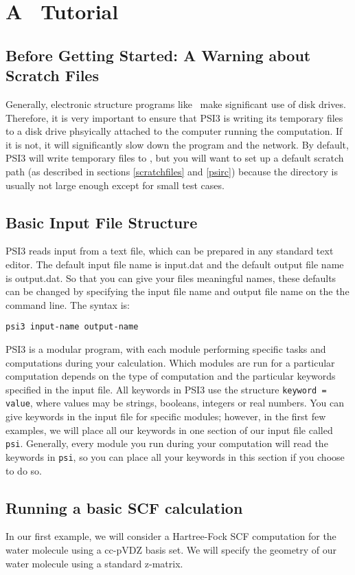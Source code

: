 \section{A \PSIthree\ Tutorial} \label{tutorial}

\subsection{Before Getting Started: A Warning about Scratch Files}
Generally, electronic structure programs like \PSIthree\ make
significant use of disk drives.  Therefore, it is very important
to ensure that PSI3 is writing its temporary files to a disk drive
phsyically attached to the computer running the computation.  If it
is not, it will significantly slow down the program and the network.
By default, PSI3 will write temporary files to , but you
will want to set up a default scratch path (as described in sections
\ref{scratchfiles} and \ref{psirc}) because the  directory
is usually not large enough except for small test cases.

\subsection{Basic Input File Structure} 

PSI3 reads input from a text file, which can be prepared in any standard
text editor.  The default input file name is input.dat and the default
output file name is output.dat.  So that you can give your files meaningful
names, these defaults can be changed by specifying the input file name and
output file name on the the command line.  The syntax is:

{\tt psi3 input-name output-name}

PSI3 is a modular program, with each module performing specific tasks
and computations during your calculation.  Which modules are run for
a particular computation depends on the type of computation and the
particular keywords specified in the input file.  All keywords in PSI3
use the structure {\tt keyword = value}, where values may be strings,
booleans, integers or real numbers.  You can give keywords in the
input file for specific modules; however, in the first few examples,
we will place all our keywords in one section of our input file called
{\tt psi}.  Generally, every module you run during your computation will
read the keywords in {\tt psi}, so you can place all your keywords in
this section if you choose to do so.

\subsection{Running a basic SCF calculation}
In our first example, we will consider a Hartree-Fock SCF computation
for the water molecule using a cc-pVDZ basis set.  We will specify the
geometry of our water molecule using a standard z-matrix.

